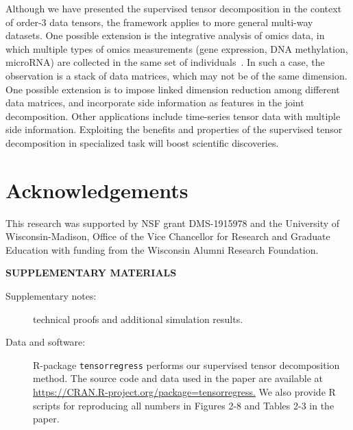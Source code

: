\documentclass[12pt]{article}
\theoremstyle{definition}
\theoremstyle{definition}
\begin{document}
Although we have presented the supervised tensor decomposition in the context of order-3 data tensors, the framework applies to more general multi-way datasets. One possible extension is the integrative analysis of omics data, in which multiple types of omics measurements (gene expression, DNA methylation, microRNA) are collected in the same set of individuals~\citep{lock2013joint,wang2019three}. In such a case, the observation is a stack of data matrices, which may not be of the same dimension. One possible extension is to impose linked dimension reduction among different data matrices, and incorporate side information as features in the joint decomposition. Other applications include time-series tensor data with multiple side information. Exploiting the benefits and properties of the supervised tensor decomposition in specialized task will boost scientific discoveries.

\section*{Acknowledgements}
This research was supported by NSF grant DMS-1915978 and the University of Wisconsin-Madison, Office of the Vice Chancellor for Research and Graduate Education with funding from the Wisconsin Alumni Research Foundation. 

\bigskip
\begin{center}
{\large\bf SUPPLEMENTARY MATERIALS}
\end{center}

\begin{description}

\item[Supplementary notes:]  technical proofs and additional simulation results.

\item[Data and software:] R-package \texttt{tensorregress} performs our supervised tensor decomposition method. The source code and data used in the paper are available at \url{https://CRAN.R-project.org/package=tensorregress.} We also provide R scripts for reproducing all numbers in Figures 2-8 and Tables 2-3 in the paper.

\end{description}



\end{document}
